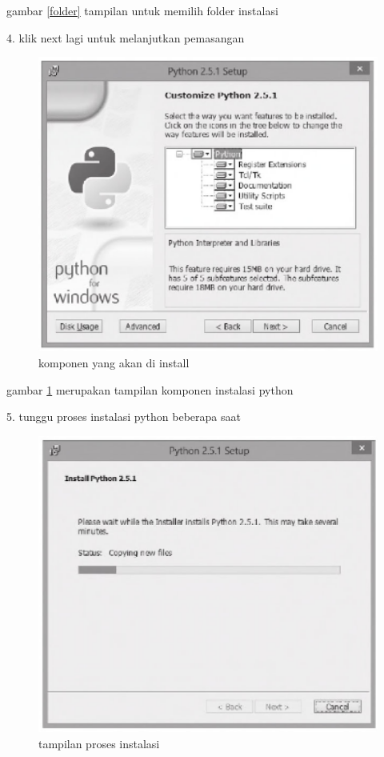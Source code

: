 	gambar \ref {folder} tampilan untuk memilih folder instalasi

	4. klik next lagi untuk melanjutkan pemasangan

	\begin{figure}[ht]
	\centerline{\includegraphics[width=1\textwidth]{figures/komponen.PNG}}
	\caption{komponen yang akan di install}
	\label{komponen}
	\end{figure}
	
	gambar \ref {komponen} merupakan tampilan komponen instalasi python

	5. tunggu proses instalasi python beberapa saat
	
	\begin{figure}[ht]
	\centerline{\includegraphics[width=1\textwidth]{figures/proses.PNG}}
	\caption{tampilan proses instalasi}
	\label{proses}
	\end{figure}
	

